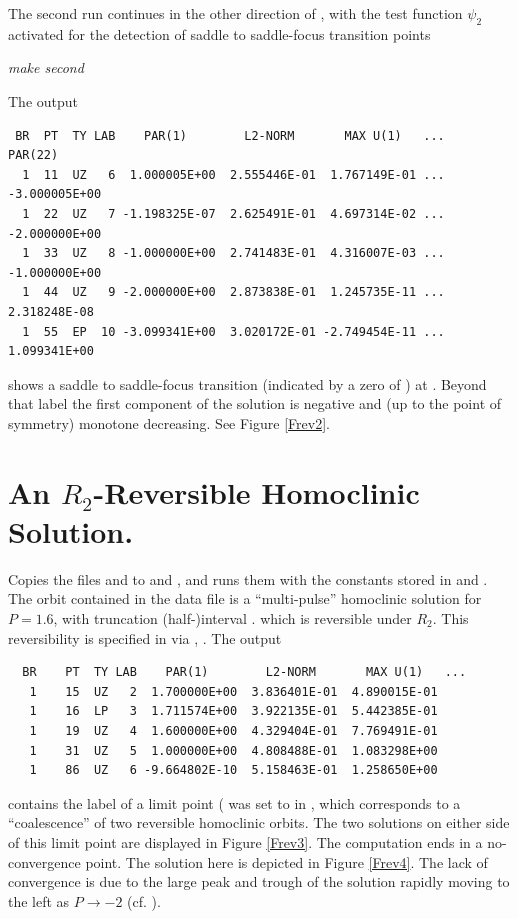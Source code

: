 \documentclass[12pt]{report}
\begin{document}
The second run continues in the other direction of , with
the test function $\psi_2$ activated 
for the detection of saddle to saddle-focus transition points
\begin{center}
\it make second
\end{center}
The output
\begin{verbatim}
 BR  PT  TY LAB    PAR(1)        L2-NORM       MAX U(1)   ...    PAR(22)    
  1  11  UZ   6  1.000005E+00  2.555446E-01  1.767149E-01 ... -3.000005E+00
  1  22  UZ   7 -1.198325E-07  2.625491E-01  4.697314E-02 ... -2.000000E+00
  1  33  UZ   8 -1.000000E+00  2.741483E-01  4.316007E-03 ... -1.000000E+00
  1  44  UZ   9 -2.000000E+00  2.873838E-01  1.245735E-11 ...  2.318248E-08
  1  55  EP  10 -3.099341E+00  3.020172E-01 -2.749454E-11 ...  1.099341E+00
\end{verbatim}
shows a saddle to saddle-focus transition 
(indicated by a zero of ) at . Beyond
that label the first component of the solution is negative and (up to the
point of symmetry) monotone decreasing. See Figure \ref{Frev2}.

\section{An $R_2$-Reversible Homoclinic Solution.}

\begin{center}
\end{center}
Copies the files  and  to 
 and , and runs them with the
constants stored in  and . 
The orbit contained in
the data file is a ``multi-pulse'' homoclinic solution for $P=1.6$, with
truncation (half-)interval .
which is reversible under $R_2$. This reversibility is
specified in  via , 
 . The output 
\begin{verbatim}
  BR    PT  TY LAB    PAR(1)        L2-NORM       MAX U(1)   ...
   1    15  UZ   2  1.700000E+00  3.836401E-01  4.890015E-01  
   1    16  LP   3  1.711574E+00  3.922135E-01  5.442385E-01  
   1    19  UZ   4  1.600000E+00  4.329404E-01  7.769491E-01  
   1    31  UZ   5  1.000000E+00  4.808488E-01  1.083298E+00  
   1    86  UZ   6 -9.664802E-10  5.158463E-01  1.258650E+00  
\end{verbatim}
contains the label of a limit point ( was set to  in
, which corresponds to a ``coalescence'' of two reversible
homoclinic orbits. The two solutions on either side of this limit point are
displayed in Figure \ref{Frev3}. The computation ends in a no-convergence
point. The solution here is depicted in Figure \ref{Frev4}. The lack of
convergence is due to the large peak and trough of the solution rapidly
moving to the left as $P \to -2$ (cf. ).
\end{document}

